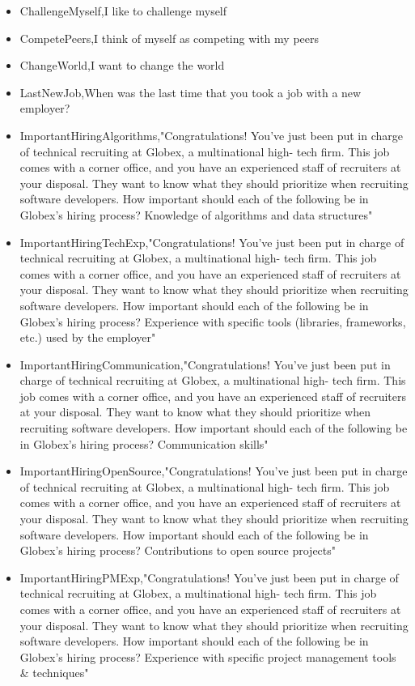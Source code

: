 \begin{appendices}
\begin{itemize}
        \item ChallengeMyself,I like to challenge myself
        \item CompetePeers,I think of myself as competing with my peers
        \item ChangeWorld,I want to change the world
        \item LastNewJob,When was the last time that you took a job with a new employer?
        \item ImportantHiringAlgorithms,"Congratulations! You've just been put in charge of technical recruiting at Globex, a multinational high- tech firm. This job comes with a corner office, and you have an experienced staff of recruiters at your disposal. They want to know what they should prioritize when recruiting software developers. How important should each of the following be in Globex's hiring process? Knowledge of algorithms and data structures"
        \item ImportantHiringTechExp,"Congratulations! You've just been put in charge of technical recruiting at Globex, a multinational high- tech firm. This job comes with a corner office, and you have an experienced staff of recruiters at your disposal. They want to know what they should prioritize when recruiting software developers. How important should each of the following be in Globex's hiring process? Experience with specific tools (libraries, frameworks, etc.) used by the employer"
        \item ImportantHiringCommunication,"Congratulations! You've just been put in charge of technical recruiting at Globex, a multinational high- tech firm. This job comes with a corner office, and you have an experienced staff of recruiters at your disposal. They want to know what they should prioritize when recruiting software developers. How important should each of the following be in Globex's hiring process? Communication skills"
        \item ImportantHiringOpenSource,"Congratulations! You've just been put in charge of technical recruiting at Globex, a multinational high- tech firm. This job comes with a corner office, and you have an experienced staff of recruiters at your disposal. They want to know what they should prioritize when recruiting software developers. How important should each of the following be in Globex's hiring process? Contributions to open source projects"
        \item ImportantHiringPMExp,"Congratulations! You've just been put in charge of technical recruiting at Globex, a multinational high- tech firm. This job comes with a corner office, and you have an experienced staff of recruiters at your disposal. They want to know what they should prioritize when recruiting software developers. How important should each of the following be in Globex's hiring process? Experience with specific project management tools & techniques"

\end{itemize}
\end{appendices}
